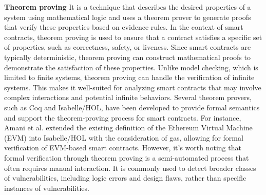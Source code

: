 \documentclass[manuscript,screen]{acmart}
\begin{document}
\textbf{Theorem proving} It is a technique that describes the desired properties of a system using mathematical logic and uses a theorem prover to generate proofs that verify these properties based on evidence rules. In the context of smart contracts, theorem proving is used to ensure that a contract satisfies a specific set of properties, such as correctness, safety, or liveness. Since smart contracts are typically deterministic, theorem proving can construct mathematical proofs to demonstrate the satisfaction of these properties. 
Unlike model checking, which is limited to finite systems, theorem proving can handle the verification of infinite systems. This makes it well-suited for analyzing smart contracts that may involve complex interactions and potential infinite behaviors. Several theorem provers, such as Coq and Isabelle/HOL, have been developed to provide formal semantics and support the theorem-proving process for smart contracts. 
For instance, Amani et al. extended the existing definition of the Ethereum Virtual Machine (EVM) into Isabelle/HOL with the consideration of gas, allowing for formal verification of EVM-based smart contracts. However, it's worth noting that formal verification through theorem proving is a semi-automated process that often requires manual interaction. It is commonly used to detect broader classes of vulnerabilities, including logic errors and design flaws, rather than specific instances of vulnerabilities.
\end{document}

